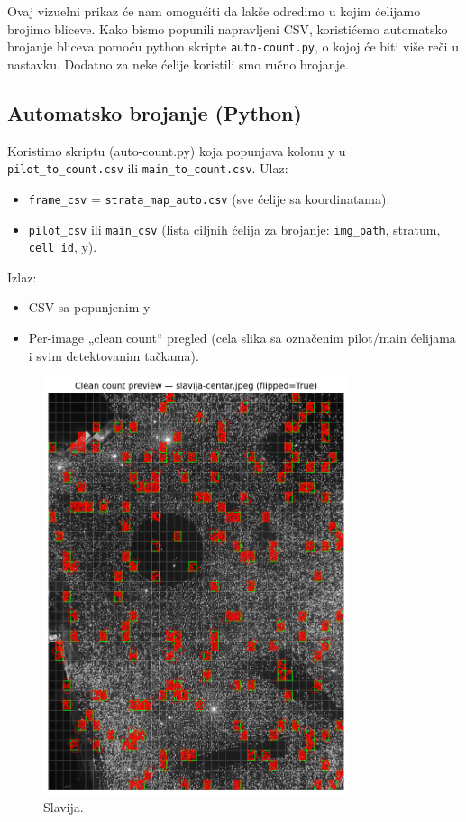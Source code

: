 \documentclass[a4paper,12pt]{article}
\begin{document}
\noindent
Ovaj vizuelni prikaz će nam omogućiti da lakše odredimo u kojim ćelijamo brojimo bliceve. 
Kako bismo popunili napravljeni CSV, koristićemo automatsko brojanje bliceva pomoću python skripte \texttt{auto-count.py}, o kojoj će biti više
reči u nastavku. Dodatno za neke ćelije koristili smo ručno brojanje.


\subsection{Automatsko brojanje (Python)}

Koristimo skriptu (auto-count.py) koja popunjava kolonu y u \texttt{pilot\_to\_count.csv} ili \texttt{main\_to\_count.csv}.
\newline
\noindent Ulaz: 
\begin{itemize}
	\item \texttt{frame\_csv} = \texttt{strata\_map\_auto.csv} (sve ćelije sa koordinatama).
	\item \texttt{pilot\_csv} ili \texttt{main\_csv} (lista ciljnih ćelija za brojanje: \texttt{img\_path}, stratum, \texttt{cell\_id}, y).
\end{itemize}
\noindent Izlaz:
\begin{itemize}
	\item CSV sa popunjenim y
	\item Per-image „clean count“ pregled (cela slika sa označenim pilot/main ćelijama i svim detektovanim tačkama).
\end{itemize}

\begin{figure}[H] 
	\centering 
	\includegraphics[width=0.8\textwidth]{../outputs/sampling_outputs/previews_images_main/slavija-centar_pilot_clean_count_preview.png} 
	\caption{Slavija.} 
	\label{fig:slavija} 
\end{figure}
\end{document}
